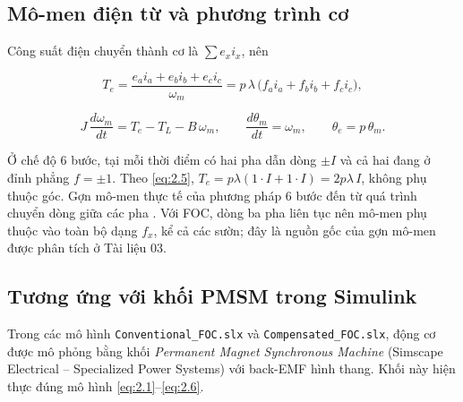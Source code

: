 \subsection{Mô-men điện từ và phương trình cơ}\label{sec:2.3}

Công suất điện chuyển thành cơ là $\sum e_x i_x$, nên

\begin{equation}
T_e = \frac{e_a i_a + e_b i_b + e_c i_c}{\omega_m} = p\,\lambda\,\big(f_a i_a + f_b i_b + f_c i_c\big),
\tag{2.5}\label{eq:2.5}
\end{equation}

\begin{equation}
J\,\frac{d\omega_m}{dt} = T_e - T_L - B\,\omega_m, \qquad \frac{d\theta_m}{dt} = \omega_m, \qquad \theta_e = p\,\theta_m .
\tag{2.6}\label{eq:2.6}
\end{equation}

\begin{ghichu}
Ở chế độ 6 bước, tại mỗi thời điểm có hai pha dẫn dòng $\pm I$ và cả hai đang ở đỉnh phẳng $f = \pm 1$. Theo \eqref{eq:2.5}, $T_e = p\lambda(1\cdot I + 1\cdot I) = 2p\lambda\, I$, không phụ thuộc góc. Gợn mô-men thực tế của phương pháp 6 bước đến từ quá trình chuyển dòng giữa các pha \cite{r4}. Với FOC, dòng ba pha liên tục nên mô-men phụ thuộc vào toàn bộ dạng $f_x$, kể cả các sườn; đây là nguồn gốc của gợn mô-men được phân tích ở Tài liệu 03.
\end{ghichu}

\subsection{Tương ứng với khối PMSM trong Simulink}\label{sec:2.4}

Trong các mô hình \texttt{Conventional\_FOC.slx} và \texttt{Compensated\_FOC.slx}, động cơ được mô phỏng bằng khối \emph{Permanent Magnet Synchronous Machine} (Simscape Electrical – Specialized Power Systems) với back-EMF hình thang. Khối này hiện thực đúng mô hình \eqref{eq:2.1}–\eqref{eq:2.6}.

